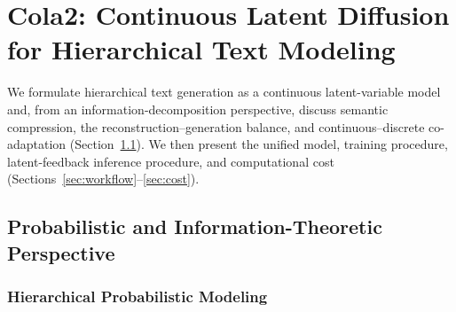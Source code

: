 \section{Cola2: Continuous Latent Diffusion for Hierarchical Text Modeling}
\label{sec:method}

We formulate hierarchical text generation as a continuous latent-variable model and, from an information-decomposition perspective, discuss semantic compression, the reconstruction--generation balance, and continuous--discrete co-adaptation (Section~\ref{sec:theory}). We then present the unified model, training procedure, latent-feedback inference procedure, and computational cost (Sections~\ref{sec:workflow}--\ref{sec:cost}).

\subsection{Probabilistic and Information-Theoretic Perspective}
\label{sec:theory}

\subsubsection{Hierarchical Probabilistic Modeling}

